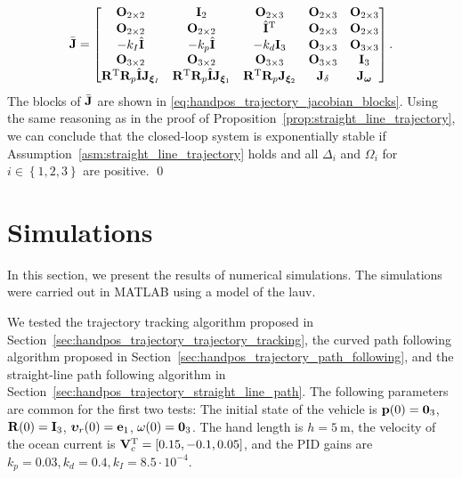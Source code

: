 \begin{equation}
    \Bar{\mathbf{J}} = \begin{bmatrix}
        \mathbf{O}_{2 \times 2} & \mathbf{I}_{2} & \mathbf{O}_{2 \times 3} & \mathbf{O}_{2 \times 3} & \mathbf{O}_{2 \times 3} \\
        \mathbf{O}_{2 \times 2} & \mathbf{O}_{2 \times 2} & \hat{\mathbf{I}}^{\mathrm{T}} & \mathbf{O}_{2 \times 3} & \mathbf{O}_{2 \times 3} \\
        -k_I \hat{\mathbf{I}} & -k_p \hat{\mathbf{I}} & -k_d \mathbf{I}_{3} & \mathbf{O}_{3 \times 3} & \mathbf{O}_{3 \times 3} \\
        \mathbf{O}_{3 \times 2} & \mathbf{O}_{3 \times 2} & \mathbf{O}_{3 \times 3} & \mathbf{O}_{3 \times 3} & \mathbf{I}_{3} \\
        \mathbf{R}^{ \rm T} \mathbf{R}_p \hat{\mathbf{I}}\mathbf{J}_{\bm{\xi}_I} & \mathbf{R}^{ \rm T} \mathbf{R}_p \hat{\mathbf{I}}\mathbf{J}_{\bm{\xi}_1} & \mathbf{R}^{ \rm T} \mathbf{R}_p \mathbf{J}_{\bm{\xi}_2} & \mathbf{J}_{\delta} & \mathbf{J}_{\bm{\omega}}
    \end{bmatrix}. \label{eq:handpos_trajectory_path_jacobian}
\end{equation}
The blocks of $\Bar{\mathbf{J}}$ are shown in \eqref{eq:handpos_trajectory_jacobian_blocks}.
Using the same reasoning as in the proof of Proposition~\ref{prop:straight_line_trajectory}, we can conclude that the closed-loop system is exponentially stable if Assumption~\ref{asm:straight_line_trajectory} holds and all $\Delta_i$ and $\Omega_i$ for $i \in \left\{1,2,3\right\}$ are positive. \qed

\section{Simulations}
\label{sec:handpos_trajectory_simulations}



In this section, we present the results of numerical simulations.
The simulations were carried out in MATLAB using a model of the \acrfull{lauv}.

We tested the trajectory tracking algorithm proposed in Section~\ref{sec:handpos_trajectory_trajectory_tracking}, the curved path following algorithm proposed in Section~\ref{sec:handpos_trajectory_path_following}, and the straight-line path following algorithm in Section~\ref{sec:handpos_trajectory_straight_line_path}.
The following parameters are common for the first two tests:
The initial state of the vehicle is $\mathbf{p}(0) = \mathbf{0}_3$, $\mathbf{R}(0) = \mathbf{I}_{3}$, $\bm{\upsilon}_r(0) = \mathbf{e}_1$, $\mathbf{\omega}(0) = \mathbf{0}_3$.
The hand length is $h = \SI{5}{\meter}$, the velocity of the ocean current is $\mathbf{V}_c^{\mathrm{T}} = \left[0.15, -0.1, 0.05\right]$, and the PID gains are $k_p = 0.03, k_d = 0.4, k_I = 8.5 \cdot 10^{-4}$.

